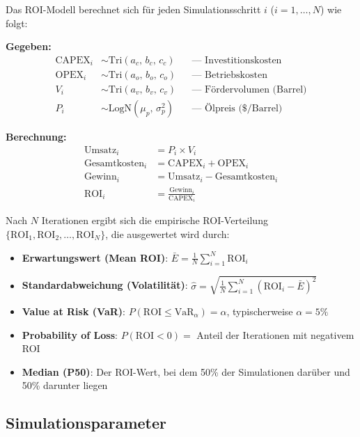 \documentclass[12pt,a4paper]{article}
\begin{document}
Das ROI-Modell berechnet sich für jeden Simulationsschritt $i$ ($i = 1, \dots, N$) wie folgt:

\textbf{Gegeben:}
\begin{align}
  \text{CAPEX}_i &\sim \text{Tri}(a_c,\, b_c,\, c_c)  & &\text{— Investitionskosten} \\
  \text{OPEX}_i  &\sim \text{Tri}(a_o,\, b_o,\, c_o)  & &\text{— Betriebskosten} \\
  V_i            &\sim \text{Tri}(a_v,\, b_v,\, c_v)  & &\text{— Fördervolumen (Barrel)} \\
  P_i            &\sim \text{LogN}(\mu_p,\, \sigma_p^2) & &\text{— Ölpreis (\$/Barrel)}
\end{align}

\textbf{Berechnung:}
\begin{align}
  \text{Umsatz}_i       &= P_i \times V_i \\
  \text{Gesamtkosten}_i &= \text{CAPEX}_i + \text{OPEX}_i \\
  \text{Gewinn}_i       &= \text{Umsatz}_i - \text{Gesamtkosten}_i \\
  \text{ROI}_i          &= \frac{\text{Gewinn}_i}{\text{CAPEX}_i}
\end{align}

Nach $N$ Iterationen ergibt sich die empirische ROI-Verteilung $\{\text{ROI}_1, \text{ROI}_2, \dots, \text{ROI}_N\}$, die ausgewertet wird durch:

\begin{itemize}[itemsep=2pt]
  \item \textbf{Erwartungswert (Mean ROI)}: $\bar{E} = \frac{1}{N}\sum_{i=1}^{N} \text{ROI}_i$
  \item \textbf{Standardabweichung (Volatilität)}: $\hat{\sigma} = \sqrt{\frac{1}{N}\sum_{i=1}^{N}(\text{ROI}_i - \bar{E})^2}$
  \item \textbf{Value at Risk (VaR)}: $P(\text{ROI} \leq \text{VaR}_\alpha) = \alpha$, typischerweise $\alpha = 5\%$
  \item \textbf{Probability of Loss}: $P(\text{ROI} < 0) = $ Anteil der Iterationen mit negativem ROI
  \item \textbf{Median (P50)}: Der ROI-Wert, bei dem 50\% der Simulationen darüber und 50\% darunter liegen
\end{itemize}

\subsection{Simulationsparameter}
\end{document}
